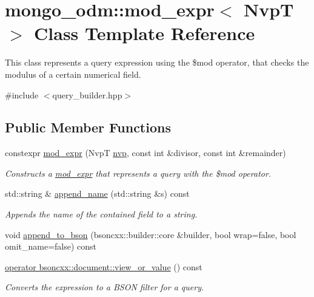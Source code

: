 \hypertarget{classmongo__odm_1_1mod__expr}{}\section{mongo\+\_\+odm\+:\+:mod\+\_\+expr$<$ NvpT $>$ Class Template Reference}
\label{classmongo__odm_1_1mod__expr}


This class represents a query expression using the \$mod operator, that checks the modulus of a certain numerical field.  




{\ttfamily \#include $<$query\+\_\+builder.\+hpp$>$}

\subsection*{Public Member Functions}
\begin{DoxyCompactItemize}
\item 
constexpr \hyperlink{classmongo__odm_1_1mod__expr_a4f89b19163b165b884999fb7129d6cbb}{mod\+\_\+expr} (NvpT \hyperlink{classmongo__odm_1_1nvp}{nvp}, const int \&divisor, const int \&remainder)
\begin{DoxyCompactList}\small\item\em Constructs a \hyperlink{classmongo__odm_1_1mod__expr}{mod\+\_\+expr} that represents a query with the \$mod operator. \end{DoxyCompactList}\item 
std\+::string \& \hyperlink{classmongo__odm_1_1mod__expr_a972c9dd595c5e4527f4da9c201a7202e}{append\+\_\+name} (std\+::string \&s) const \hypertarget{classmongo__odm_1_1mod__expr_a972c9dd595c5e4527f4da9c201a7202e}{}\label{classmongo__odm_1_1mod__expr_a972c9dd595c5e4527f4da9c201a7202e}

\begin{DoxyCompactList}\small\item\em Appends the name of the contained field to a string. \end{DoxyCompactList}\item 
void \hyperlink{classmongo__odm_1_1mod__expr_a52ce6de2ac9eee27d2088f1bfa4f07b7}{append\+\_\+to\+\_\+bson} (bsoncxx\+::builder\+::core \&builder, bool wrap=false, bool omit\+\_\+name=false) const 
\begin{DoxyCompactList}\small\item\em {}
\end{DoxyCompactList}\item 
\hyperlink{classmongo__odm_1_1mod__expr_a7366a9879d7285d968f6e8ea10918f83}{operator bsoncxx\+::document\+::view\+\_\+or\+\_\+value} () const 
\begin{DoxyCompactList}\small\item\em Converts the expression to a B\+S\+ON filter for a query. \end{DoxyCompactList}\end{DoxyCompactItemize}


